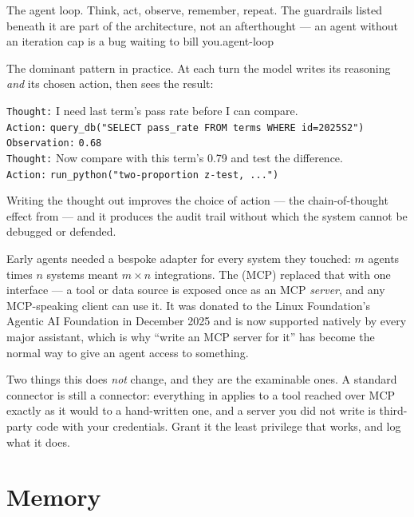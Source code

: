 {The agent loop. Think, act, observe, remember, repeat. The guardrails listed beneath it
are part of the architecture, not an afterthought --- an agent without an iteration cap is
a bug waiting to bill you.}{agent-loop}

\begin{conceptbox}
The dominant pattern in practice. At each turn the model writes its reasoning
\emph{and} its chosen action, then sees the result:

\smallskip
\texttt{Thought:} I need last term's pass rate before I can compare.\\
\texttt{Action:} \texttt{query\_db("SELECT pass\_rate FROM terms WHERE id=2025S2")}\\
\texttt{Observation:} \texttt{0.68}\\
\texttt{Thought:} Now compare with this term's 0.79 and test the difference.\\
\texttt{Action:} \texttt{run\_python("two-proportion z-test, ...")}

\smallskip
Writing the thought out improves the choice of action --- the chain-of-thought
effect from  --- and it produces the audit trail without which the
system cannot be debugged or defended.
\end{conceptbox}

\begin{conceptbox}
Early agents needed a bespoke adapter for every system they touched: $m$ agents
times $n$ systems meant $m \times n$ integrations. The  (MCP) replaced that with one interface --- a tool or data source is
exposed once as an MCP \emph{server}, and any MCP-speaking client can use it. It
was donated to the Linux Foundation's Agentic AI Foundation in December 2025 and
is now supported natively by every major assistant, which is why ``write an MCP
server for it'' has become the normal way to give an agent access to something.

Two things this does \emph{not} change, and they are the examinable ones. A
standard connector is still a connector: everything in 
applies to a tool reached over MCP exactly as it would to a hand-written one, and
a server you did not write is third-party code with your credentials. Grant it the
least privilege that works, and log what it does.
\end{conceptbox}

\section{Memory}

